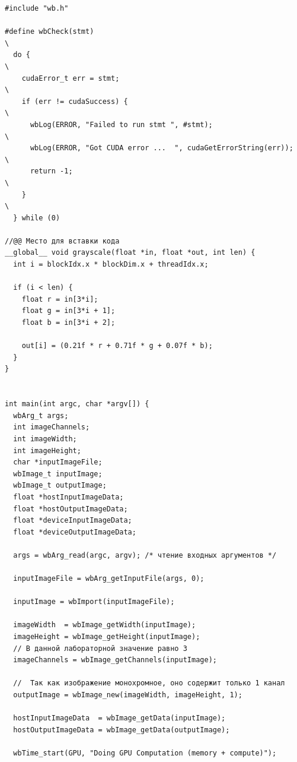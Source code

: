 \documentclass[14pt]{extarticle}
\newenvironment{code}{\captionsetup{type=listing, belowskip=-14pt plus 3pt minus 0pt}}{}
\begin{document}
\begin{code}    
\caption{Содержание rvs\_laboratories\_3/rvs\_laboratories\_3.cu\label{lst:main}}
\begin{verbatim}
#include "wb.h"

#define wbCheck(stmt)                                                     \
  do {                                                                    \
    cudaError_t err = stmt;                                               \
    if (err != cudaSuccess) {                                             \
      wbLog(ERROR, "Failed to run stmt ", #stmt);                         \
      wbLog(ERROR, "Got CUDA error ...  ", cudaGetErrorString(err));      \
      return -1;                                                          \
    }                                                                     \
  } while (0)

//@@ Место для вставки кода
__global__ void grayscale(float *in, float *out, int len) {
  int i = blockIdx.x * blockDim.x + threadIdx.x;

  if (i < len) {
    float r = in[3*i];
    float g = in[3*i + 1];
    float b = in[3*i + 2];

    out[i] = (0.21f * r + 0.71f * g + 0.07f * b);
  }
}


int main(int argc, char *argv[]) {
  wbArg_t args;
  int imageChannels;
  int imageWidth;
  int imageHeight;
  char *inputImageFile;
  wbImage_t inputImage;
  wbImage_t outputImage;
  float *hostInputImageData;
  float *hostOutputImageData;
  float *deviceInputImageData;
  float *deviceOutputImageData;

  args = wbArg_read(argc, argv); /* чтение входных аргументов */

  inputImageFile = wbArg_getInputFile(args, 0);

  inputImage = wbImport(inputImageFile);

  imageWidth  = wbImage_getWidth(inputImage);
  imageHeight = wbImage_getHeight(inputImage);
  // В данной лабораторной значение равно 3
  imageChannels = wbImage_getChannels(inputImage);

  //  Так как изображение монохромное, оно содержит только 1 канал
  outputImage = wbImage_new(imageWidth, imageHeight, 1);

  hostInputImageData  = wbImage_getData(inputImage);
  hostOutputImageData = wbImage_getData(outputImage);

  wbTime_start(GPU, "Doing GPU Computation (memory + compute)");


\end{verbatim}
\end{code}
\end{document}
